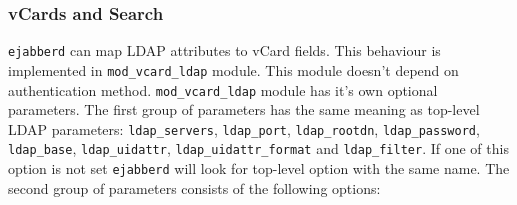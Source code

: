 \documentclass[a4paper,10pt]{article}
\newcommand{\option}[1]{\texttt{#1}}
\newcommand{\ejabberd}{\texttt{ejabberd}}
\newcommand{\module}[1]{\texttt{#1}}
\newcommand{\modvcardldap}{\module{mod\_vcard\_ldap}}
\begin{document}
\subsubsection{vCards and Search}
\label{sec:modvcardldap}

\ejabberd{} can map LDAP attributes to vCard fields.  This behaviour is
implemented in \modvcardldap{} module.  This module doesn't depend on
authentication method.  \modvcardldap{} module has it's own optional
parameters.  The first group of parameters has the same meaning as top-level
LDAP parameters: \option{ldap\_servers}, \option{ldap\_port},
\option{ldap\_rootdn}, \option{ldap\_password}, \option{ldap\_base},
\option{ldap\_uidattr}, \option{ldap\_uidattr\_format} and
\option{ldap\_filter}.  If one of this option is not set \ejabberd{} will look
for top-level option with the same name.  The second group of parameters
consists of the following options:
\end{document}
